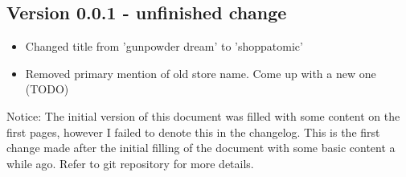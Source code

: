 \documentclass[10pt,a4paper]{article}
\begin{document}
\subsection{Version 0.0.1 - unfinished change}
\begin{itemize}
\item Changed title from 'gunpowder dream' to 'shoppatomic'
\item Removed primary mention of old store name. Come up with a new one (TODO)
\end{itemize}
Notice: The initial version of this document was filled with some content on the first pages, however I failed to denote this in the changelog. This is the first change made after the initial filling of the document with some basic content a while ago. Refer to git repository for more details.

\date{June 04, 2021}
\end{document}
